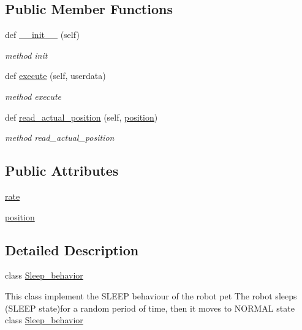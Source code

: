 \subsection*{Public Member Functions}
\begin{DoxyCompactItemize}
\item 
def \hyperlink{classbehavior__manager_1_1Sleep__behavior_a778df3c5a36999ef4792e6ac444bd7f3}{\+\_\+\+\_\+init\+\_\+\+\_\+} (self)
\begin{DoxyCompactList}\small\item\em method init \end{DoxyCompactList}\item 
def \hyperlink{classbehavior__manager_1_1Sleep__behavior_a02d87859cb76d2dbdf78d9d6e2452782}{execute} (self, userdata)
\begin{DoxyCompactList}\small\item\em method execute \end{DoxyCompactList}\item 
def \hyperlink{classbehavior__manager_1_1Sleep__behavior_ac785f650f0f82ab1f05c5862dd94f689}{read\+\_\+actual\+\_\+position} (self, \hyperlink{classbehavior__manager_1_1Sleep__behavior_a587f13df5a10450d4ecb4512e4f846e6}{position})
\begin{DoxyCompactList}\small\item\em method read\+\_\+actual\+\_\+position \end{DoxyCompactList}\end{DoxyCompactItemize}
\subsection*{Public Attributes}
\begin{DoxyCompactItemize}
\item 
\hyperlink{classbehavior__manager_1_1Sleep__behavior_a75cca73975838d3ee66cc687726685de}{rate}
\item 
\hyperlink{classbehavior__manager_1_1Sleep__behavior_a587f13df5a10450d4ecb4512e4f846e6}{position}
\end{DoxyCompactItemize}


\subsection{Detailed Description}
class \hyperlink{classbehavior__manager_1_1Sleep__behavior}{Sleep\+\_\+behavior} 

This class implement the S\+L\+E\+EP behaviour of the robot pet The robot sleeps (S\+L\+E\+EP state)for a random period of time, then it moves to N\+O\+R\+M\+AL state class \hyperlink{classbehavior__manager_1_1Sleep__behavior}{Sleep\+\_\+behavior}

